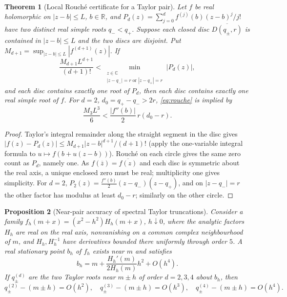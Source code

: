 \documentclass[11pt,a4paper]{article}
\numberwithin{equation}{section}
\newtheorem{theorem}{Theorem}[section]
\newtheorem{proposition}[theorem]{Proposition}
\newcommand{\R}{\mathbb R}
\newcommand{\C}{\mathbb C}
\begin{document}
\begin{theorem}[Local Rouch\'e certificate for a Taylor pair]\label{thm:rouche}
Let $f$ be real holomorphic on $|z-b|\le L$, $b\in\R$, and $P_d(z)=\sum_{j=0}^d f^{(j)}(b)(z-b)^j/j!$ have two distinct real simple roots $q_-<q_+$. Suppose each closed disc $\overline{D(q_\pm,r)}$ is contained in $|z-b|\le L$ and the two discs are disjoint. Put $M_{d+1}=\sup_{|z-b|\le L}|f^{(d+1)}(z)|$. If
\begin{equation}\label{eq:rouche}
\frac{M_{d+1}L^{d+1}}{(d+1)!}
<\min_{\substack{z\in\C\\ |z-q_-|=r\;\text{or}\;|z-q_+|=r}}|P_d(z)|,
\end{equation}
and each disc contains exactly one root of $P_d$, then each disc contains exactly one \emph{real simple} root of $f$. For $d=2$, $d_0=q_+-q_->2r$, \eqref{eq:rouche} is implied by
\begin{equation}\label{eq:quadratic}
\frac{M_3L^3}{6}<\frac{|f''(b)|}{2}\,r(d_0-r).
\end{equation}
\end{theorem}
\begin{proof}
Taylor's integral remainder along the straight segment in the disc gives $|f(z)-P_d(z)|\le M_{d+1}|z-b|^{d+1}/(d+1)!$ (apply the one-variable integral formula to $u\mapsto f(b+u(z-b))$). Rouch\'e on each circle gives the same zero count as $P_d$, namely one. As $f(\overline z)=\overline{f(z)}$ and each disc is symmetric about the real axis, a unique enclosed zero must be real; multiplicity one gives simplicity. For $d=2$, $P_2(z)=\frac{f''(b)}2(z-q_-)(z-q_+)$, and on $|z-q_-|=r$ the other factor has modulus at least $d_0-r$; similarly on the other circle.
\end{proof}
\begin{proposition}[Near-pair accuracy of spectral Taylor truncations]\label{prop:near}
Consider a family
$f_h(m+x)=(x^2-h^2)H_h(m+x)$, $h\downarrow0$, where the analytic factors $H_h$ are real on the real axis, nonvanishing on a common complex neighbourhood of $m$, and $H_h,H_h^{-1}$ have derivatives bounded there uniformly through order $5$. A real stationary point $b_h$ of $f_h$ exists near $m$ and satisfies
\begin{equation}\label{eq:bshift}
b_h=m+\frac{H_h'(m)}{2H_h(m)}h^2+O(h^4).
\end{equation}
If $q^{(d)}_\pm$ are the two Taylor roots near $m\pm h$ of order $d=2,3,4$ about $b_h$, then
\begin{equation}\label{eq:nearorders}
q^{(2)}_\pm-(m\pm h)=O(h^2),\quad
q^{(3)}_\pm-(m\pm h)=O(h^3),\quad
q^{(4)}_\pm-(m\pm h)=O(h^4).
\end{equation}
\end{proposition}
\end{document}
